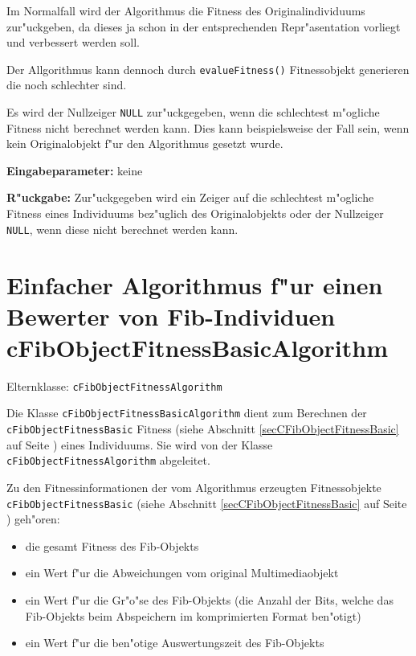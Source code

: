 Im Normalfall wird der Algorithmus die Fitness des Originalindividuums zur"uckgeben, da dieses ja schon in der entsprechenden Repr"asentation vorliegt und verbessert werden soll.

Der Allgorithmus kann dennoch durch \verb|evalueFitness()| Fitnessobjekt generieren die noch schlechter sind.

Es wird der Nullzeiger \verb|NULL| zur"uckgegeben, wenn die schlechtest m"ogliche Fitness nicht berechnet werden kann. Dies kann beispielsweise der Fall sein, wenn kein Originalobjekt f"ur den Algorithmus gesetzt wurde.

\bigskip\noindent
\textbf{Eingabeparameter:} keine

\bigskip\noindent
\textbf{R"uckgabe:} Zur"uckgegeben wird ein Zeiger auf die schlechtest m"ogliche Fitness eines Individuums bez"uglich des Originalobjekts oder der Nullzeiger \verb|NULL|, wenn diese nicht berechnet werden kann.



\section{Einfacher Algorithmus f"ur einen Bewerter von Fib-Individuen cFibObjectFitnessBasicAlgorithm}
\label{secCFibObjectFitnessAlgorithmusBasic}

Elternklasse: \verb|cFibObjectFitnessAlgorithm|

\bigskip\noindent
Die Klasse \verb|cFibObjectFitnessBasicAlgorithm| dient zum Berechnen der \verb|cFibObjectFitnessBasic| Fitness (siehe Abschnitt \ref{secCFibObjectFitnessBasic} auf Seite \pageref{secCFibObjectFitnessBasic}) eines Individuums. Sie wird von der Klasse \verb|cFibObjectFitnessAlgorithm| abgeleitet.


\bigskip\noindent
Zu den Fitnessinformationen der vom Algorithmus erzeugten Fitnessobjekte \verb|cFibObjectFitnessBasic| (siehe Abschnitt \ref{secCFibObjectFitnessBasic} auf Seite \pageref{secCFibObjectFitnessBasic}) geh"oren:
\begin{itemize}
 \item die gesamt Fitness des Fib-Objekts
 \item ein Wert f"ur die Abweichungen vom original Multimediaobjekt
 \item ein Wert f"ur die Gr"o"se des Fib-Objekts (die Anzahl der Bits, welche das Fib-Objekts beim Abspeichern im komprimierten Format ben"otigt)
 \item ein Wert f"ur die ben"otige Auswertungszeit des Fib-Objekts
\end{itemize}

